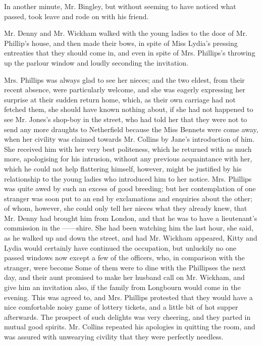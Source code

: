 In another minute, Mr. Bingley, but without seeming to have noticed what passed, took leave and rode on with his friend.

Mr. Denny and Mr. Wickham walked with the young ladies to the door of Mr. Phillip's house, and then made their bows, in spite of Miss Lydia's pressing entreaties that they should come in, and even in spite of Mrs. Phillips's throwing up the parlour window and loudly seconding the invitation.

Mrs. Phillips was always glad to see her nieces; and the two eldest, from their recent absence, were particularly welcome, and she was eagerly expressing her surprise at their sudden return home, which, as their own carriage had not fetched them, she should have known nothing about, if she had not happened to see Mr. Jones's shop-boy in the street, who had told her that they were not to send any more draughts to Netherfield because the Miss Bennets were come away, when her civility was claimed towards Mr. Collins by Jane's introduction of him. She received him with her very best politeness, which he returned with as much more, apologising for his intrusion, without any previous acquaintance with her, which he could not help flattering himself, however, might be justified by his relationship to the young ladies who introduced him to her notice. Mrs. Phillips was quite awed by such an excess of good breeding; but her contemplation of one stranger was soon put to an end by exclamations and enquiries about the other; of whom, however, she could only tell her nieces what they already knew, that Mr. Denny had brought him from London, and that he was to have a lieutenant's commission in the ------shire. She had been watching him the last hour, she said, as he walked up and down the street, and had Mr. Wickham appeared, Kitty and Lydia would certainly have continued the occupation, but unluckily no one passed windows now except a few of the officers, who, in comparison with the stranger, were become  Some of them were to dine with the Phillipses the next day, and their aunt promised to make her husband call on Mr. Wickham, and give him an invitation also, if the family from Longbourn would come in the evening. This was agreed to, and Mrs. Phillips protested that they would have a nice comfortable noisy game of lottery tickets, and a little bit of hot supper afterwards. The prospect of such delights was very cheering, and they parted in mutual good spirits. Mr. Collins repeated his apologies in quitting the room, and was assured with unwearying civility that they were perfectly needless.

